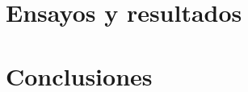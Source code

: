 \documentclass[11pt,a4paper]{article}
\begin{document}
\newpage
\section{Ensayos y resultados}










\newpage
\section{Conclusiones}





\newpage

\end{document}
